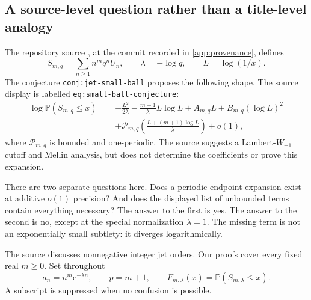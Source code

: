 \documentclass[11pt,a4paper]{article}
\numberwithin{equation}{section}
\theoremstyle{definition}
\newcommand{\Prob}{\mathbb P}
\newcommand{\ee}{\mathrm e}
\begin{document}
\subsection{A source-level question rather than a title-level analogy}
The repository source \cite{repojets}, at the commit recorded in \cref{app:provenance}, defines
\begin{equation}
 S_{m,q}=\sum_{n\geq1}n^m q^n U_n,\qquad \lambda=-\log q,
 \qquad L=\log(1/x).
 \label{eq:model-source}
\end{equation}
The conjecture \nolinkurl{conj:jet-small-ball} proposes the following shape. The source display is labelled \nolinkurl{eq:small-ball-conjecture}:
\begin{equation}
\begin{split}
 \log\Prob(S_{m,q}\leq x)
 ={}&-\frac{L^2}{2\lambda}-\frac{m+1}{\lambda}L\log L
       +A_{m,q}L+B_{m,q}(\log L)^2\\
 &+\mathcal P_{m,q}\left(\frac{L+(m+1)\log L}{\lambda}\right)+o(1),
\end{split}
\label{eq:old-conjecture}
\end{equation}
where $\mathcal P_{m,q}$ is bounded and one-periodic. The source suggests a Lambert-$W_{-1}$ cutoff and Mellin analysis, but does not determine the coefficients or prove this expansion.

There are two separate questions here. Does a periodic endpoint expansion exist at additive $o(1)$ precision? And does the displayed list of unbounded terms contain everything necessary? The answer to the first is yes. The answer to the second is no, except at the special normalization $\lambda=1$. The missing term is not an exponentially small subtlety: it diverges logarithmically.

The source discusses nonnegative integer jet orders. Our proofs cover every fixed real $m\geq0$. Set throughout
\begin{equation}
 a_n=n^m\ee^{-\lambda n},\qquad p=m+1,
 \qquad F_{m,\lambda}(x)=\Prob(S_{m,\lambda}\leq x).
 \label{eq:model}
\end{equation}
A subscript is suppressed when no confusion is possible.
\end{document}
